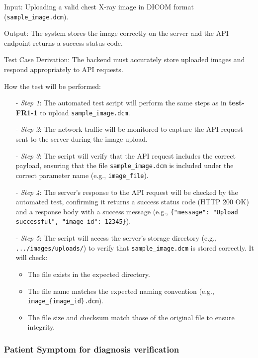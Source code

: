 \documentclass[12pt, titlepage]{article}
\begin{document}
\begin{enumerate}
Input: Uploading a valid chest X-ray image in DICOM format (\texttt{sample\_image.dcm}).

Output: The system stores the image correctly on the server and the API endpoint returns a success status code.

Test Case Derivation: The backend must accurately store uploaded images and respond appropriately to API requests.

How the test will be performed: 
\begin{itemize}
  \item[-] \textit{Step 1}: The automated test script will perform the same steps as in \textbf{test-FR1-1} to upload \texttt{sample\_image.dcm}.
  \item[-] \textit{Step 2}: The network traffic will be monitored to capture the API request sent to the server during the image upload.
  \item[-] \textit{Step 3}: The script will verify that the API request includes the correct payload, ensuring that the file \texttt{sample\_image.dcm} is included under the correct parameter name (e.g., \texttt{image\_file}).
  \item[-] \textit{Step 4}: The server's response to the API request will be checked by the automated test, confirming it returns a success status code (HTTP 200 OK) and a response body with a success message (e.g., \texttt{\{"message": "Upload successful", "image\_id": 12345\}}).
  \item[-] \textit{Step 5}: The script will access the server's storage directory (e.g., \texttt{.../images/uploads/}) to verify that \texttt{sample\_image.dcm} is stored correctly. It will check:
    \begin{itemize}
      \item The file exists in the expected directory.
      \item The file name matches the expected naming convention (e.g., \texttt{image\_\{image\_id\}.dcm}).
      \item The file size and checksum match those of the original file to ensure integrity.
    \end{itemize}
  \end{itemize}
\end{enumerate}

\subsubsection{Patient Symptom for diagnosis verification }
\end{document}

